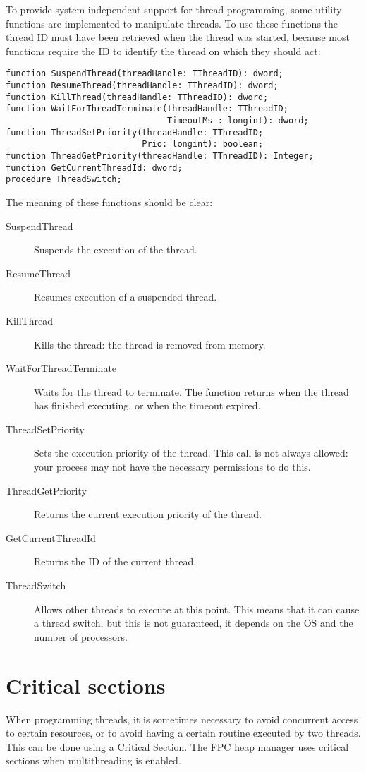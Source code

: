 To provide system-independent support for thread programming, some utility functions are 
implemented to manipulate threads. To use these functions the thread ID must have been 
retrieved when the thread was started, because most functions require the ID to identify 
the thread on which they should act:
\begin{verbatim}
function SuspendThread(threadHandle: TThreadID): dword;
function ResumeThread(threadHandle: TThreadID): dword;
function KillThread(threadHandle: TThreadID): dword;
function WaitForThreadTerminate(threadHandle: TThreadID;
                                TimeoutMs : longint): dword;
function ThreadSetPriority(threadHandle: TThreadID; 
                           Prio: longint): boolean;
function ThreadGetPriority(threadHandle: TThreadID): Integer;
function GetCurrentThreadId: dword;
procedure ThreadSwitch;
\end{verbatim}
The meaning of these functions should be clear:
\begin{description}
\item[SuspendThread] Suspends the execution of the thread.
\item[ResumeThread] Resumes execution of a suspended thread.
\item[KillThread] Kills the thread: the thread is removed from memory.
\item[WaitForThreadTerminate] Waits for the thread to terminate. 
The function returns when the thread has finished executing, or 
when the timeout expired.
\item[ThreadSetPriority] Sets the execution priority of the thread. 
This call is not always allowed: your process may not have the necessary
permissions to do this.
\item[ThreadGetPriority] Returns the current execution priority of the thread.
\item[GetCurrentThreadId] Returns the ID of the current thread.
\item[ThreadSwitch] Allows other threads to execute at this point. This
means that it can cause a thread switch, but this is not guaranteed, it depends 
on the OS and the number of processors.
\end{description}

\section{Critical sections}
When programming threads, it is sometimes necessary to avoid concurrent 
access to certain resources, or to avoid having a certain routine 
executed by two threads. This can be done using a Critical Section.
The FPC heap manager uses critical sections when multithreading is 
enabled.

